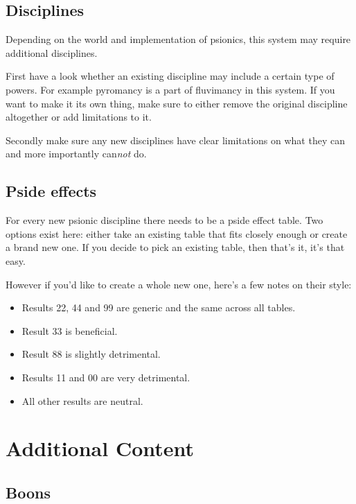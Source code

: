 \documentclass[12pt,a4paper,openany]{book}
\begin{document}
	\section{Disciplines}
	Depending on the world and implementation of psionics, this system may require additional disciplines.\par
	First have a look whether an existing discipline may include a certain type of powers. For example pyromancy is a part of fluvimancy in this system. If you want to make it its own thing, make sure to either remove the original discipline altogether or add limitations to it.\par
	Secondly make sure any new disciplines have clear limitations on what they can and more importantly can\emph{not} do.
	\section{Pside effects}
	For every new psionic discipline there needs to be a pside effect table. Two options exist here: either take an existing table that fits closely enough or create a brand new one. If you decide to pick an existing table, then that's it, it's that easy.\par
	However if you'd like to create a whole new one, here's a few notes on their style:
	\begin{itemize}
		\item Results 22, 44 and 99 are generic and the same across all tables.
		\item Result 33 is beneficial.
		\item Result 88 is slightly detrimental.
		\item Results 11 and 00 are very detrimental.
		\item All other results are neutral.
	\end{itemize}
	
	\chapter{Additional Content}
	\label{ch:addcontent}
	\section{Boons}
	
\end{document}
